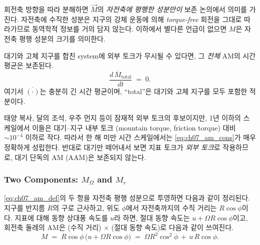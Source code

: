 \noindent
회전축 방향을 따라 분해하면 $\vec{M}$의 \emph{자전축에 평행한 성분만이} 보존 논의에서
의미를 가진다.  자전축에 수직한 성분은 지구의 강체 운동에 의해 \emph{torque-free}
회전을 그대로 따라가므로 동역학적 정보를 거의 담지 않는다.  이하에서 별다른 언급이
없으면 $M$은 자전축 평행 성분의 크기를 의미한다.

\begin{theorem}\label{thm:ch07_am_conservation}
대기와 고체 지구를 합친 system에 외부 토크가 무시될 수 있다면, 그 \emph{전체} AM의
시간 평균은 보존된다.
\begin{equation}\label{eq:ch07_am_cons}
  \frac{d\,\overline{M}_{\text{total}}}{dt} \;=\; 0.
\end{equation}
여기서 $\overline{(\cdot)}$는 충분히 긴 시간 평균이며, ``total''은 대기와 고체 지구를
모두 포함한 적분이다.
\end{theorem}


\begin{remark}
태양 복사, 달의 조석, 우주 먼지 등이 잠재적 외부 토크의 후보이지만, 1년 이하의
스케일에서 이들은 대기--지구 내부 토크 (mountain torque, friction torque) 대비
$\sim 10^{-4}$ 이하로 작다.  따라서 한 해 미만 시간 스케일에서는
\eqref{eq:ch07_am_cons}가 매우 정확하게 성립한다.  반대로 대기만 떼어내서 보면
지표 토크가 \emph{외부 토크}로 작용하므로, 대기 단독의 AM (AAM)은 보존되지 않는다.
\end{remark}

\subsubsection{Two Components: \texorpdfstring{$M_\Omega$}{M\_Omega} and \texorpdfstring{$M_r$}{M\_r}}

\eqref{eq:ch07_am_def}의 두 항을 자전축 평행 성분으로 투영하면 다음과 같이
정리된다.  지구를 반지름 $R$의 구로 근사하고, 위도 $\phi$에서 자전축까지의
수직 거리는 $R\cos\phi$이다.  지표에 대해 동향 상대풍 속도를 $u$라 하면,
절대 동향 속도는 $u + \Omega R\cos\phi$이고, 회전축 둘레의 AM은 (수직 거리) $\times$
(절대 동향 속도)로 다음과 같이 쓰여진다.
\begin{equation}\label{eq:ch07_am_components_raw}
  M \;=\; R\cos\phi \,\bigl(u + \Omega R\cos\phi\bigr)
       \;=\; \Omega R^2 \cos^2\phi \,+\, u\,R\cos\phi.
\end{equation}

